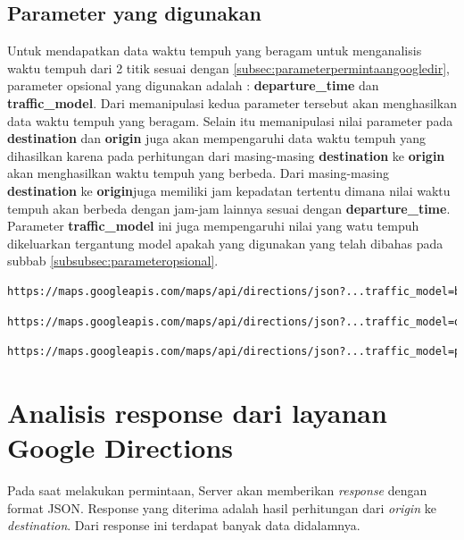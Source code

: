 \subsection{Parameter yang digunakan}
\label{subsec:parameterrequestaplikasi}			

Untuk mendapatkan data waktu tempuh yang beragam untuk menganalisis waktu tempuh dari 2 titik sesuai dengan \ref{subsec:parameterpermintaangoogledir}, parameter opsional yang digunakan adalah :  \textbf{departure\_time} dan \textbf{traffic\_model}. Dari memanipulasi kedua parameter tersebut akan menghasilkan data waktu tempuh yang beragam. Selain itu memanipulasi nilai parameter pada \textbf{destination} dan  \textbf{origin} juga akan mempengaruhi data waktu tempuh yang dihasilkan karena pada perhitungan dari masing-masing \textbf{destination} ke \textbf{origin} akan menghasilkan waktu tempuh yang berbeda. Dari masing-masing \textbf{destination} ke \textbf{origin}juga memiliki jam kepadatan tertentu dimana nilai waktu tempuh akan berbeda dengan jam-jam lainnya sesuai dengan \textbf{departure\_time}. Parameter \textbf{traffic\_model} ini juga mempengaruhi nilai yang watu tempuh dikeluarkan tergantung model apakah yang digunakan yang telah dibahas pada subbab \ref{subsubsec:parameteropsional}.

\begin{lstlisting}[caption= Traffic\_model : best\_guess, captionpos=b]
	https://maps.googleapis.com/maps/api/directions/json?...traffic_model=best_guess
\end{lstlisting}
\begin{lstlisting}[caption= Traffic\_model : optimistic, captionpos=b]
	https://maps.googleapis.com/maps/api/directions/json?...traffic_model=optimistic
\end{lstlisting}
\begin{lstlisting}[caption= Traffic\_model : pessimistic, captionpos=b]
	https://maps.googleapis.com/maps/api/directions/json?...traffic_model=pessimistic
\end{lstlisting}

\section{Analisis response dari layanan Google Directions}
\label{sec:analisisresponsegoogledir}

Pada saat melakukan permintaan, Server akan memberikan \textit{response} dengan format JSON. Response yang diterima adalah hasil perhitungan dari \textit{origin} ke \textit{destination}. Dari response ini terdapat banyak data didalamnya.

